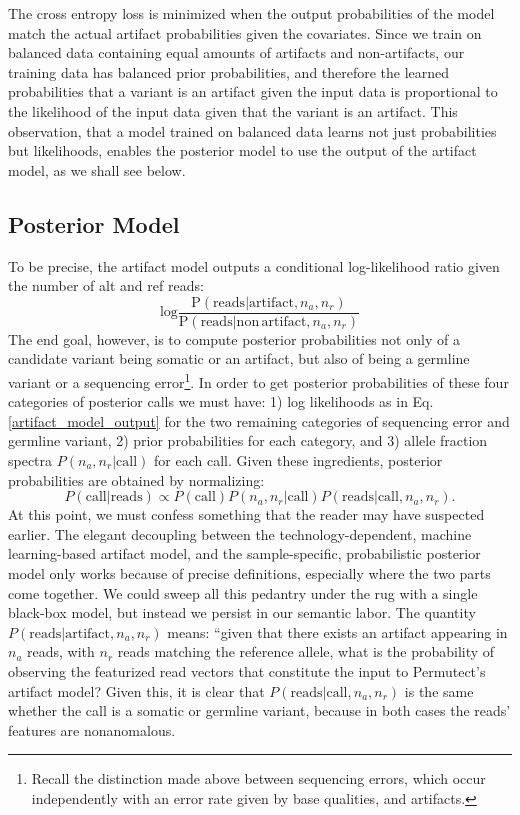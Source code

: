 \documentclass[times, twoside, watermark]{StyleBioRxiv}
\begin{document}
The cross entropy loss is minimized when the output probabilities of the model match the actual artifact probabilities given the covariates.  Since we train on balanced data containing equal amounts of artifacts and non-artifacts, our training data has balanced prior probabilities, and therefore the learned probabilities that a variant is an artifact given the input data is proportional to the likelihood of the input data given that the variant is an artifact.  This observation, that a model trained on balanced data learns not just probabilities but likelihoods, enables the posterior model to use the output of the artifact model, as we shall see below.

\subsection*{Posterior Model}
To be precise, the artifact model outputs a conditional log-likelihood ratio given the number of alt and ref reads:
\begin{equation}
    \mathrm{log} \frac{\mathrm{P}(\mathrm{reads}|\mathrm{artifact}, n_a, n_r)}{\mathrm{P}(\mathrm{reads}|\mathrm{non\,artifact}, n_a, n_r)} \label{artifact_model_output}
\end{equation}
The end goal, however, is to compute posterior probabilities not only of a candidate variant being somatic or an artifact, but also of being a germline variant or a sequencing error\footnote{Recall the distinction made above between sequencing errors, which occur independently with an error rate given by base qualities, and artifacts.}.  In order to get posterior probabilities of these four categories of posterior calls we must have: 1) log likelihoods as in Eq. \ref{artifact_model_output} for the two remaining categories of sequencing error and germline variant, 2) prior probabilities for each category, and 3) allele fraction spectra $P(n_a, n_r|\mathrm{call})$ for each call.  Given these ingredients, posterior probabilities are obtained by normalizing:
\begin{equation}
    P(\mathrm{call} | \mathrm{reads}) \propto P(\mathrm{call}) P(n_a, n_r | \mathrm{call}) P(\mathrm{reads} | \mathrm{call}, n_a, n_r).
    \label{eq:posterior_prob}
\end{equation}
At this point, we must confess something that the reader may have suspected earlier. The elegant decoupling between the technology-dependent, machine learning-based artifact model, and the sample-specific, probabilistic posterior model only works because of precise definitions, especially where the two parts come together.  We could sweep all this pedantry under the rug with a single black-box model, but instead we persist in our semantic labor.  The quantity $P(\mathrm{reads} | \mathrm{artifact}, n_a, n_r)$ means: ``given that there exists an artifact appearing in $n_a$ reads, with $n_r$ reads matching the reference allele, what is the probability of observing the featurized read vectors that constitute the input to Permutect's artifact model?  Given this, it is clear that $P(\mathrm{reads} | \mathrm{call}, n_a, n_r)$ is the same whether the call is a somatic or germline variant, because in both cases the reads' features are nonanomalous.
\end{document}
